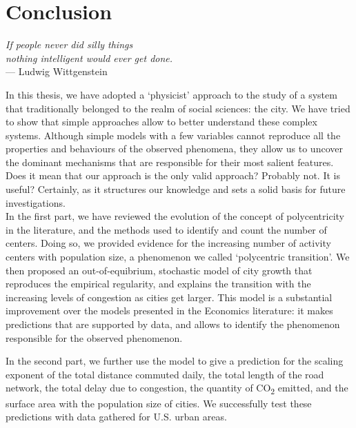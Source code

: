 %
\chapter{Conclusion}
\label{sec:conclusion}

\begin{flushright}{\slshape    
If people never did silly things\\
nothing intelligent would ever get done.} \\ \medskip
--- Ludwig Wittgenstein~\cite{Luckhardt:1979}
\end{flushright}

\bigskip

In this thesis, we have adopted a `physicist' approach to the study of a system
that traditionally belonged to the realm of social sciences: the city. We have
tried to show that simple approaches allow to better understand
these complex systems. Although simple models with a few variables cannot
reproduce all the properties and behaviours of the observed phenomena, they
allow us to uncover the dominant mechanisms that are responsible for their most
salient features. Does it mean that our approach is the only valid approach?
Probably not. It is useful? Certainly, as it structures
our knowledge and sets a solid basis for future investigations.\\

In the first part, we have reviewed the evolution of the concept of
polycentricity in the literature, and the methods used to identify and count the
number of centers. Doing so, we provided evidence for the increasing number of
activity centers with population size, a phenomenon we called `polycentric
transition'. We then proposed an out-of-equibrium, stochastic model of
city growth that reproduces the empirical regularity, and explains the
transition with the increasing levels of congestion as cities get larger. This
model is a substantial improvement over the models presented in the Economics
literature: it makes predictions that are supported by data, and allows to
identify the phenomenon responsible for the observed phenomenon. 

In the second part, we further use the model to give a prediction for the
scaling exponent of the total distance commuted daily, the total length of the
road network, the total delay due to congestion, the quantity of
CO\textsubscript{2} emitted, and the surface area with the population size of
cities. We successfully test these predictions with data gathered for U.S. urban
areas.


